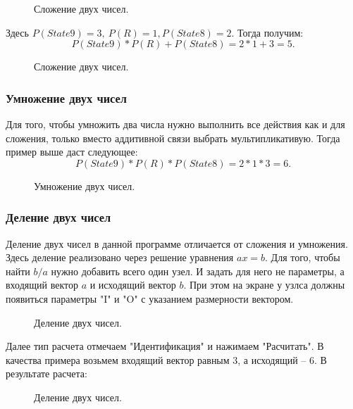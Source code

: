 \documentclass{article}
\numberwithin{equation}{section}
\begin{document}
\begin{figure}[h]
\caption{Сложение двух чисел.}
\label{ris:image8}
\end{figure}


Здесь $P(State9) = 3, \ P(R) = 1, P(State8) = 2.$
Тогда получим:
$$
P(State9) * P(R) + P(State8) = 2 * 1 + 3 = 5.
$$
\begin{figure}[h]
\caption{Сложение двух чисел.}
\label{ris:image9}
\end{figure}

\subsubsection{Умножение двух чисел}

\qquad Для того, чтобы умножить два числа нужно выполнить все действия как и для сложения, только вместо аддитивной связи выбрать мультипликативую. Тогда пример выше даст следующее:
$$
P(State9) * P(R) * P(State8) = 2 * 1 * 3 = 6.
$$
\begin{figure}[h]
\caption{Умножение двух чисел.}
\label{ris:image10}
\end{figure}
 \newpage

\subsubsection{Деление двух чисел}

\qquad Деление двух чисел в данной программе отличается от сложения и умножения. Здесь деление реализовано через решение уравнения $ax = b$. Для того, чтобы найти $b/a$ нужно добавить всего один узел. И задать для него не параметры, а входящий вектор $a$ и исходящий вектор $b$. При этом на экране у узлса должны появиться параметры "I" и "O" с указанием размерности вектором. 

\begin{figure}[h]
\caption{Деление двух чисел.}
\label{ris:image11}
\end{figure}

Далее тип расчета отмечаем "Идентификация" и нажимаем "Расчитать". В качества примера возьмем входящий вектор равным $3$, а исходящий -- $6$. В результате расчета:
\begin{figure}[h]
\caption{Деление двух чисел.}
\label{ris:image12}
\end{figure}
\end{document}
